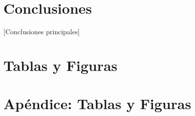 \documentclass[12pt,a4paper,onecolumn]{article}
\begin{document}
\section{Conclusiones}
[Conclusiones principales]


\pagebreak
\singlespacing

\pagebreak

\section*{Tablas y Figuras}


\pagebreak

\appendix
\renewcommand{\theequation}{\Alph{chapter}.\arabic{equation}}

\setcounter{figure}{0}
\setcounter{table}{0}
\makeatletter 
\renewcommand{\thefigure}{A.\@arabic\c@figure}
\renewcommand{\thetable}{A.\@arabic\c@table}

\section{Apéndice: Tablas y Figuras}\label{sec:appendix_tables} 
\end{document}
